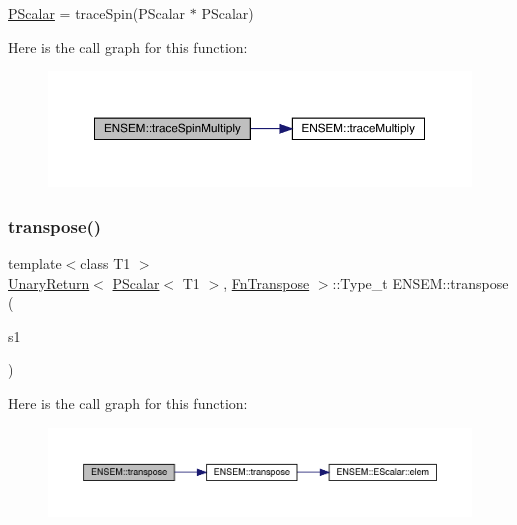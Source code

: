 \mbox{\hyperlink{classENSEM_1_1PScalar}{P\+Scalar}} = trace\+Spin(\+P\+Scalar $\ast$ P\+Scalar) 

Here is the call graph for this function\+:\nopagebreak
\begin{figure}[H]
\begin{center}
\leavevmode
\includegraphics[width=350pt]{db/dcc/group__primscalar_gadf055daaaacb2711107a9c9dbba9a129_cgraph}
\end{center}
\end{figure}
\mbox{\label{group__primscalar_gafa9e84efffc0a6f10d97120033276f1c}} 
\subsubsection{\texorpdfstring{transpose()}{transpose()}}
{\footnotesize\ttfamily template$<$class T1 $>$ \\
\mbox{\hyperlink{structENSEM_1_1UnaryReturn}{Unary\+Return}}$<$ \mbox{\hyperlink{classENSEM_1_1PScalar}{P\+Scalar}}$<$ T1 $>$, \mbox{\hyperlink{structENSEM_1_1FnTranspose}{Fn\+Transpose}} $>$\+::Type\+\_\+t E\+N\+S\+E\+M\+::transpose (\begin{DoxyParamCaption}\item[{const \mbox{\hyperlink{classENSEM_1_1PScalar}{P\+Scalar}}$<$ T1 $>$ \&}]{s1 }\end{DoxyParamCaption})\hspace{0.3cm}{\ttfamily [inline]}}

Here is the call graph for this function\+:\nopagebreak
\begin{figure}[H]
\begin{center}
\leavevmode
\includegraphics[width=350pt]{db/dcc/group__primscalar_gafa9e84efffc0a6f10d97120033276f1c_cgraph}
\end{center}
\end{figure}
\mbox{\label{group__primscalar_ga2696f074fb7cc4b547788bbf78867d23}} 
